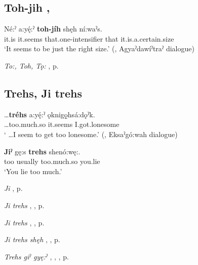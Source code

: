 \subsection*{\textbf{Toh-jih} , } \label{p:[toh-jih]}

\ea
\label{ex:tpart80}
\gll Né:ˀ a:yę́:ˀ \textbf{toh-jíh} shęh ní:waˀs.\\
it.is it.seems that.one-intensifier that it.is.a.certain.size\\
\glt ‘It seems to be just the right size.’ (\cite[225]{mithun_watewayestanih_1984}, Agyaˀdawíˀtraˀ dialogue)
\z

\begin{CayugaRelated}
\item \textit{To:, Toh, Tǫ:} , p. \pageref{p:[to:] ‘that one’}
\end{CayugaRelated}



\subsection*{\textbf{Trehs, Ji trehs} } \label{p:[trehs, ji trehs]}

\ea
\label{ex:tpart105}
\gll …\textbf{tréhs} a:yę́:ˀ ǫknigǫ̱hsá:dǫˀk.\\
…too.much.so it.seems I.got.lonesome\\
\glt ‘ …I seem to get too lonesome.’ (\cite[88]{mithun_watewayestanih_1984}, Eksaˀgó:wah dialogue)
\z

\ea
\label{ex:tpart106}
\gll \textbf{Jiˀ} gę:s \textbf{trehs} shenó:wę:.\\
too usually too.much.so you.lie\\
\glt ‘You lie too much.’
\z

\begin{CayugaRelated}
\item \textit{Ji} , p. \pageref{p:[ji]}\\
\item \textit{Ji trehs} , , p. \pageref{p:[ji trehs] ‘more (than usual)’}\\
\item \textit{Ji trehs} , , p. \pageref{p:[ji trehs] ‘because’}\\
\item \textit{Ji trehs shęh} , , p. \pageref{p:[ji trehs shęh]}\\
\item \textit{Trehs giˀ gyę:ˀ} , , , p. \pageref{p:[trehs giˀ gyę:ˀ]}
\end{CayugaRelated}


